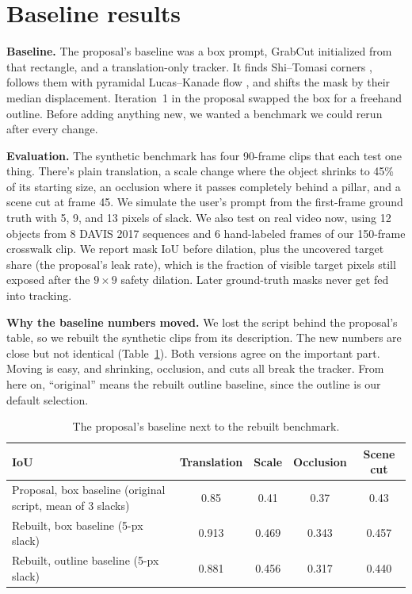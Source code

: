 \section{Baseline results}

\textbf{Baseline.} The proposal's baseline was a box prompt, GrabCut \cite{grabcut} initialized
from that rectangle, and a translation-only tracker. It finds Shi--Tomasi corners \cite{shitomasi},
follows them with pyramidal Lucas--Kanade flow \cite{lk}, and shifts the mask by their median
displacement. Iteration~1 in the proposal swapped the box for a freehand outline. Before adding
anything new, we wanted a benchmark we could rerun after every change.

\textbf{Evaluation.} The synthetic benchmark has four 90-frame clips that each test one thing.
There's plain translation, a scale change where the object shrinks to 45\% of its starting size, an
occlusion where it passes completely behind a pillar, and a scene cut at frame 45. We simulate the
user's prompt from the first-frame ground truth with 5, 9, and 13 pixels of slack. We also test on
real video now, using 12 objects from 8 DAVIS 2017 \cite{davis} sequences and 6 hand-labeled frames
of our 150-frame crosswalk clip. We report mask IoU before dilation, plus the uncovered target
share (the proposal's leak rate), which is the fraction of visible target pixels still exposed after
the $9{\times}9$ safety dilation. Later ground-truth masks never get fed into tracking.

\textbf{Why the baseline numbers moved.} We lost the script behind the proposal's table, so we
rebuilt the synthetic clips from its description. The new numbers are close but not identical
(Table~\ref{tab:baseline}). Both versions agree on the important part. Moving is easy, and
shrinking, occlusion, and cuts all break the tracker. From here on, ``original'' means the rebuilt
outline baseline, since the outline is our default selection.

\begin{table}[h]
\centering\small
\begin{tabular}{lcccc}
\toprule
IoU & Translation & Scale & Occlusion & Scene cut \\
\midrule
Proposal, box baseline (original script, mean of 3 slacks) & 0.85 & 0.41 & 0.37 & 0.43 \\
Rebuilt, box baseline (5-px slack) & 0.913 & 0.469 & 0.343 & 0.457 \\
Rebuilt, outline baseline (5-px slack) & 0.881 & 0.456 & 0.317 & 0.440 \\
\bottomrule
\end{tabular}
\caption{The proposal's baseline next to the rebuilt benchmark.}
\label{tab:baseline}
\end{table}

